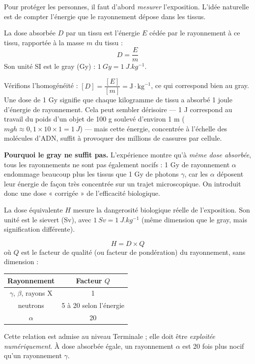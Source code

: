 \documentclass[11pt]{article}
\newcommand{\cle}[1]{{\popxbold\color{popdark}#1}}
\begin{document}
Pour protéger les personnes, il faut d'abord \emph{mesurer} l'exposition. L'idée naturelle est de compter l'énergie que le rayonnement dépose dans les tissus.

\begin{definition}
La \cle{dose absorbée} $D$ par un tissu est l'énergie $E$ cédée par le rayonnement à ce tissu, rapportée à la masse $m$ du tissu :
\[ D = \dfrac{E}{m} \]
Son unité SI est le \cle{gray} (Gy) : $\SI{1}{Gy} = \SI{1}{J.kg^{-1}}$.
\end{definition}

Vérifions l'homogénéité : $[D] = \dfrac{[E]}{[m]} = \mathrm{J \cdot kg^{-1}}$, ce qui correspond bien au gray. Une dose de 1 Gy signifie que chaque kilogramme de tissu a absorbé 1 joule d'énergie de rayonnement. Cela peut sembler dérisoire — 1 J correspond au travail du poids d'un objet de 100 g soulevé d'environ 1 m ($mgh \approx 0{,}1 \times 10 \times 1 = \SI{1}{J}$) — mais cette énergie, concentrée à l'échelle des molécules d'ADN, suffit à provoquer des millions de cassures par cellule.

\textbf{Pourquoi le gray ne suffit pas.} L'expérience montre qu'à \emph{même dose absorbée}, tous les rayonnements ne sont pas également nocifs : 1 Gy de rayonnement $\alpha$ endommage beaucoup plus les tissus que 1 Gy de photons $\gamma$, car les $\alpha$ déposent leur énergie de façon très concentrée sur un trajet microscopique. On introduit donc une dose « corrigée » de l'efficacité biologique.

\begin{definition}
La \cle{dose équivalente} $H$ mesure la dangerosité biologique réelle de l'exposition. Son unité est le \cle{sievert} (Sv), avec $\SI{1}{Sv} = \SI{1}{J.kg^{-1}}$ (même dimension que le gray, mais signification différente).
\end{definition}

\begin{propriete}
\[ H = D \times Q \]
où $Q$ est le \cle{facteur de qualité} (ou facteur de pondération) du rayonnement, sans dimension :
\begin{center}
\begin{tabular}{|c|c|}
\hline
\rowcolor{popblueL} \textbf{Rayonnement} & \textbf{Facteur $Q$} \\
\hline
$\gamma$, $\beta$, rayons X & 1 \\
\hline
neutrons & 5 à 20 selon l'énergie \\
\hline
$\alpha$ & 20 \\
\hline
\end{tabular}
\end{center}
Cette relation est admise au niveau Terminale ; elle doit être \emph{exploitée numériquement}. À dose absorbée égale, un rayonnement $\alpha$ est 20 fois plus nocif qu'un rayonnement $\gamma$.
\end{propriete}
\end{document}
